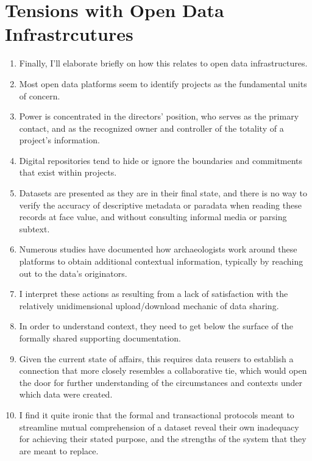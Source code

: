 \documentclass[12pt]{article}
\begin{document}
\section{Tensions with Open Data Infrastrcutures}
\begin{enumerate}
  \item Finally, I'll elaborate briefly on how this relates to open data infrastructures.
  \item Most open data platforms seem to identify projects as the fundamental units of concern.
  \item Power is concentrated in the directors' position, who serves as the primary contact, and as the recognized owner and controller of the totality of a project's information.
  \item Digital repositories tend to hide or ignore the boundaries and commitments that exist within projects.
  \item Datasets are presented as they are in their final state, and there is no way to verify the accuracy of descriptive metadata or paradata when reading these records at face value, and without consulting informal media or parsing subtext.
  \item Numerous studies have documented how archaeologists work around these platforms to obtain additional contextual information, typically by reaching out to the data's originators.
  \item I interpret these actions as resulting from a lack of satisfaction with the relatively unidimensional upload/download mechanic of data sharing.
  \item In order to understand context, they need to get below the surface of the formally shared supporting documentation.
  \item Given the current state of affairs, this requires data reusers to establish a connection that more closely resembles a collaborative tie, which would open the door for further understanding of the circumstances and contexts under which data were created.
  \item I find it quite ironic that the formal and transactional protocols meant to streamline mutual comprehension of a dataset reveal their own inadequacy for achieving their stated purpose, and the strengths of the system that they are meant to replace.
\end{enumerate}
\end{document}
